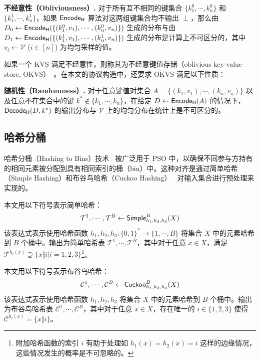 \noindent \textbf{不经意性（Obliviousness）.} 对于所有互不相同的键集合 $\{k_1^0, \cdots, k_n^0\}$ 和 $\{k_1^1, \cdots, k_n^1\}$，如果 $\mathsf{Encode_H}$ 算法对这两组键集合均不输出 $\perp$，那么由 $D_0 \gets \mathsf{Encode_H}(\{(k_1^0,v_1), \cdots, (k_n^0,v_n)\})$ 生成的分布与由 $D_1 \gets \mathsf{Encode_H}(\{(k_1^1,v_1), \cdots, (k_n^1,v_n)\})$ 生成的分布是计算上不可区分的，其中 $v_i \gets \mathcal{V}$ ($i \in [n]$) 为均匀采样的值。

如果一个 KVS 满足不经意性，则称其为不经意键值存储（oblivious key-value store, OKVS）~\cite{PRTY20,GPRTY-CRYPTO-2021,RR-CCS-2022,BPSY-USENIX-2023}。在本文的协议构造中，还要求 OKVS 满足以下性质：

\noindent \textbf{随机性（Randomness）.} 对于任意键值对集合 $A = \{(k_1, v_1), \cdots ,(k_n, v_n)\}$ 以及任意不在集合中的键 $k^* \notin \{k_1, \cdots , k_n\}$，在给定 $D \gets \mathsf{Encode_H}(A)$ 的情况下，$\mathsf{Decode_H}(D, k^*)$ 的输出分布与 $\mathcal{V}$ 上的均匀分布在统计上是不可区分的。

\subsection{哈希分桶}

哈希分桶（Hashing to Bins）技术~\cite{PSZ-USENIX-2014,PSZ-USENIX-2015} 被广泛用于 PSO 中，以确保不同参与方持有的相同元素被分配到具有相同索引的桶（bin）中。这种对齐是通过简单哈希（Simple Hashing）和布谷鸟哈希（Cuckoo Hashing）~\cite{PR04} 对输入集合进行预处理来实现的。

本文用以下符号表示简单哈希：
\begin{gather*}
\mathcal{T}^1, \cdots, \mathcal{T}^B \gets \mathsf{Simple}_{h_1,h_2,h_3}^B(X)
\end{gather*}
该表达式表示使用哈希函数 $h_1, h_2, h_3: \{0, 1\}^* \to \{1, \cdots, B\}$ 将集合 $X$ 中的元素哈希到 $B$ 个桶中。输出为简单哈希表 $\mathcal{T}^1, \cdots, \mathcal{T}^B$，其中对于任意 $x \in X$，满足 $\mathcal{T}^{h_i(x)} \supseteq \{x \Vert i \vert i= 1, 2, 3\}$\footnote{附加哈希函数的索引 $i$ 有助于处理如 $h_1(x) = h_2(x) = i$ 这样的边缘情况，这些情况发生的概率是不可忽略的。}。

本文用以下符号表示布谷鸟哈希：
\begin{gather*}
\mathcal{C}^1, \cdots, \mathcal{C}^B \gets \mathsf{Cuckoo}_{h_1,h_2,h_3}^B(X)
\end{gather*}
该表达式表示使用哈希函数 $h_1, h_2, h_3$ 将集合 $X$ 中的元素哈希到 $B$ 个桶中。输出为布谷鸟哈希表 $\mathcal{C}^1, \cdots, \mathcal{C}^B$，其中对于任意 $x \in X$，存在唯一的 $i \in \{1, 2, 3\}$ 使得 $\mathcal{C}^{h_i(x)} = \{x \Vert i\}$。

